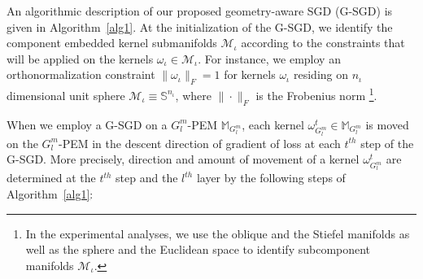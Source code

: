 \documentclass[10pt,journal,compsoc]{IEEEtran}
\theoremstyle{definition}
\theoremstyle{definition}
\theoremstyle{remark}
\theoremstyle{remark}
\theoremstyle{remark}
\begin{document}
An algorithmic description of our proposed geometry-aware SGD (G-SGD) is given in Algorithm~\ref{alg1}. At the initialization of the G-SGD, we identify the component embedded kernel submanifolds $\mathcal{M}_{\iota}$ according to the constraints that will be applied on the kernels $\omega_{\iota} \in \mathcal{M}_{\iota}$. For instance, we employ an orthonormalization constraint $\| \omega_{\iota} \|_F = 1$ for kernels $\omega_{\iota}$ residing on $n_{\iota}$ dimensional unit sphere $\mathcal{M}_{\iota} \equiv \mathbb{S}^{n_{\iota}}$, where $\| \cdot \| _F$ is the Frobenius norm \cite{manopt_book}\footnote{In the experimental analyses, we use the oblique and the Stiefel manifolds as well as the sphere and the Euclidean space to identify subcomponent manifolds $\mathcal{M}_{\iota}$.}. 

When we employ a G-SGD on a $G^m_l$-PEM $\mathbb{M}_{G^m_l}$, each kernel $\omega_{G^m_l}^t \in \mathbb{M}_{G^m_l}$ is moved on the $G^m_l$-PEM in the descent direction of gradient of loss at each $t^{th}$ step of the G-SGD. More precisely, direction and amount of movement of a kernel $\omega^t_{G^m_l}$ are determined at the $t^{th}$ step and the $l^{th}$ layer by the following steps of Algorithm~\ref{alg1}:

\end{document}
